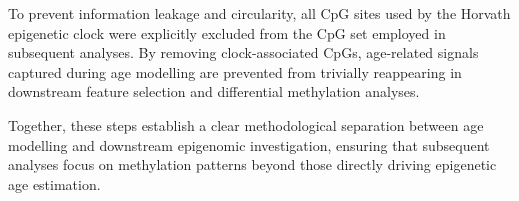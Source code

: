 \documentclass[10pt]{extarticle}
\begin{document}
To prevent information leakage and circularity, all CpG sites used by the Horvath epigenetic clock were explicitly excluded from the CpG set employed in subsequent analyses. By removing clock-associated CpGs, age-related signals captured during age modelling are prevented from trivially reappearing in downstream feature selection and differential methylation analyses.

Together, these steps establish a clear methodological separation between age modelling and downstream epigenomic investigation, ensuring that subsequent analyses focus on methylation patterns beyond those directly driving epigenetic age estimation.








\printbibliography
\end{document}
